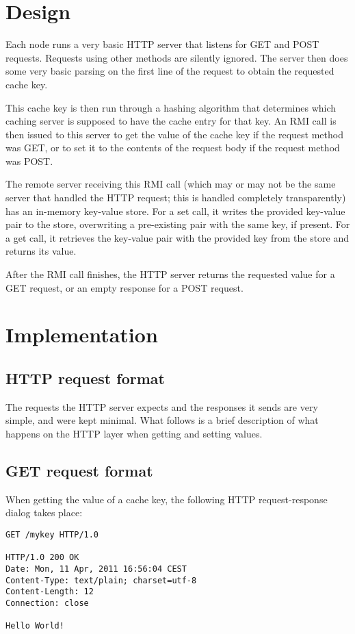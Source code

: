 \documentclass{article}
\begin{document}
\section*{Design}
Each node runs a very basic HTTP server that listens for GET and POST requests. Requests using
other methods are silently ignored. The server then does some very basic parsing on the first line
of the request to obtain the requested cache key.

This cache key is then run through a hashing algorithm that determines which caching server is
supposed to have the cache entry for that key. An RMI call is then issued to this server to
get the value of the cache key if the request method was GET, or to set it to the contents
of the request body if the request method was POST.

The remote server receiving this RMI call (which may or may not be the same server that
handled the HTTP request; this is handled completely transparently) has an in-memory
key-value store. For a set call, it writes the provided key-value pair to the store,
overwriting a pre-existing pair with the same key, if present. For a get call, it
retrieves the key-value pair with the provided key from the store and returns its
value.

After the RMI call finishes, the HTTP server returns the requested value for a GET
request, or an empty response for a POST request.

\section*{Implementation}
\subsection*{HTTP request format}
The requests the HTTP server expects and the responses it sends are very simple,
and were kept minimal. What follows is a brief description of what happens on the
HTTP layer when getting and setting values.

\subsection*{GET request format}
When getting the value of a cache key, the following HTTP request-response
dialog takes place:

\begin{lstlisting}
GET /mykey HTTP/1.0

HTTP/1.0 200 OK
Date: Mon, 11 Apr, 2011 16:56:04 CEST
Content-Type: text/plain; charset=utf-8
Content-Length: 12
Connection: close

Hello World!
\end{lstlisting}
\end{document}
